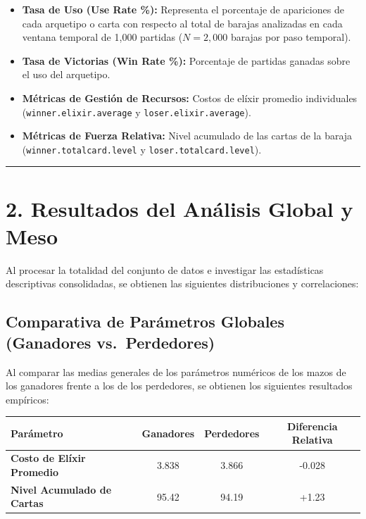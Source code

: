 \documentclass[
  spanish,
  12pt,
]{report}
\newcounter{none} %
\providecommand{\tightlist}{%
  \setlength{\itemsep}{0pt}\setlength{\parskip}{0pt}}
\begin{document}
\begin{itemize}
\tightlist
\item
  \textbf{Tasa de Uso (Use Rate \%):} Representa el porcentaje de
  apariciones de cada arquetipo o carta con respecto al total de barajas
  analizadas en cada ventana temporal de 1,000 partidas (\(N = 2,000\)
  barajas por paso temporal).
\item
  \textbf{Tasa de Victorias (Win Rate \%):} Porcentaje de partidas
  ganadas sobre el uso del arquetipo.
\item
  \textbf{Métricas de Gestión de Recursos:} Costos de elíxir promedio
  individuales (\texttt{winner.elixir.average} y
  \texttt{loser.elixir.average}).
\item
  \textbf{Métricas de Fuerza Relativa:} Nivel acumulado de las cartas de
  la baraja (\texttt{winner.totalcard.level} y
  \texttt{loser.totalcard.level}).
\end{itemize}

\begin{center}\rule{0.5\linewidth}{0.5pt}\end{center}

\section{2. Resultados del Análisis Global y
Meso}\label{resultados-del-anuxe1lisis-global-y-meso}

Al procesar la totalidad del conjunto de datos e investigar las
estadísticas descriptivas consolidadas, se obtienen las siguientes
distribuciones y correlaciones:

\subsection{Comparativa de Parámetros Globales (Ganadores
vs.~Perdedores)}\label{comparativa-de-paruxe1metros-globales-ganadores-vs.-perdedores}

Al comparar las medias generales de los parámetros numéricos de los
mazos de los ganadores frente a los de los perdedores, se obtienen los
siguientes resultados empíricos:

{\def\LTcaptype{none} %
\begin{longtable}[]{@{}lccc@{}}
\toprule\noalign{}
Parámetro & Ganadores & Perdedores & Diferencia Relativa \\
\midrule\noalign{}
\endhead
\bottomrule\noalign{}
\endlastfoot
\textbf{Costo de Elíxir Promedio} & 3.838 & 3.866 & -0.028 \\
\textbf{Nivel Acumulado de Cartas} & 95.42 & 94.19 & +1.23 \\
\end{longtable}
}
\end{document}
